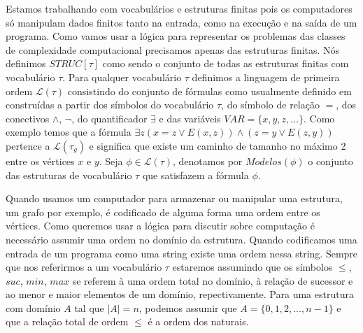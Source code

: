 Estamos trabalhando com vocabulários e estruturas finitas pois os computadores só manipulam dados finitos tanto na entrada, como na execução e na saída de um programa. Como vamos usar a lógica para representar os problemas das classes de complexidade computacional precisamos apenas das estruturas finitas. Nós definimos $STRUC[\tau]$ como sendo o conjunto de todas as estruturas finitas com vocabulário $\tau$.
Para qualquer vocabulário $\tau$ definimos a linguagem de primeira ordem $\mathcal{L}(\tau)$ consistindo do conjunto de fórmulas como usualmente definido em \cite{ebbingaus} construídas a partir dos símbolos do vocabulário $\tau$, do símbolo de relação $=$, dos conectivos $\wedge$, $\neg$, do quantificador $\exists$ e das variáveis $VAR =\{x, y, z, ...\}$. Como exemplo temos que a fórmula $\exists z (x = z \vee E(x, z)) \wedge (z = y \vee E(z, y))$ pertence a $\mathcal{L}(\tau_g)$ e significa que existe um caminho de tamanho no máximo 2 entre os vértices $x$ e $y$.
Seja $\phi \in \mathcal{L}(\tau)$, denotamos por $Modelos(\phi)$ o conjunto das estruturas de vocabulário $\tau$ que satisfazem a fórmula $\phi$. %

%
Quando usamos um computador para armazenar ou manipular uma estrutura, um grafo por exemplo, é codificado de alguma forma uma ordem entre os vértices. Como queremos usar a lógica para discutir sobre computação é necessário assumir uma ordem no domínio da estrutura. Quando codificamos uma entrada de um programa como uma string existe uma ordem nessa string. Sempre que nos referirmos a um vocabulário $\tau$ estaremos assumindo que os símbolos $\le$, $suc$, $min$, $max$ se referem à uma ordem total no domínio, à relação de sucessor e ao menor e maior elementos de um domínio, repectivamente. Para uma estrutura com domínio $A$ tal que $|A| = n$, podemos assumir que $A = \{0, 1, 2, ..., n-1\}$ e que a relação total de ordem $\le$ é a ordem dos naturais.

